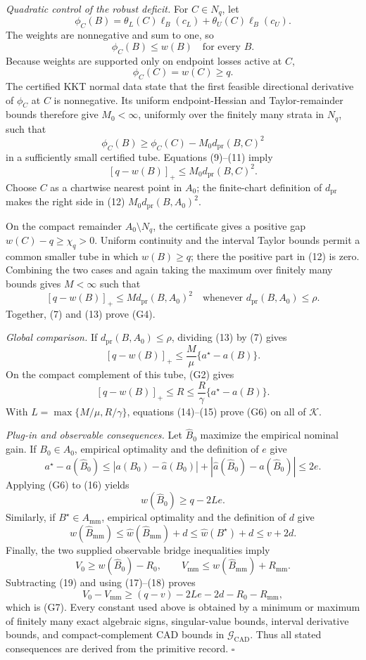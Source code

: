 \emph{Quadratic control of the robust deficit.}
For \(C\in N_q\), let
\[
\phi_C(B)=\theta_L(C)\ell_B(c_L)+\theta_U(C)\ell_B(c_U).
\tag{8}
\]
The weights are nonnegative and sum to one, so
\[
\phi_C(B)\le w(B)
\quad\text{for every }B.
\tag{9}
\]
Because weights are supported only on endpoint losses active at \(C\),
\[
\phi_C(C)=w(C)\ge q.
\tag{10}
\]
The certified KKT normal data state that the first feasible directional derivative of \(\phi_C\) at \(C\) is nonnegative.  Its uniform endpoint-Hessian and Taylor-remainder bounds therefore give \(M_0<\infty\), uniformly over the finitely many strata in \(N_q\), such that
\[
\phi_C(B)\ge\phi_C(C)-M_0d_{\mathrm{pr}}(B,C)^2
\tag{11}
\]
in a sufficiently small certified tube.  Equations (9)--(11) imply
\[
[q-w(B)]_+\le M_0d_{\mathrm{pr}}(B,C)^2.
\tag{12}
\]
Choose \(C\) as a chartwise nearest point in \(A_0\); the finite-chart definition of \(d_{\mathrm{pr}}\) makes the right side in (12) \(M_0d_{\mathrm{pr}}(B,A_0)^2\).

On the compact remainder \(A_0\setminus N_q\), the certificate gives a positive gap \(w(C)-q\ge\chi_q>0\).  Uniform continuity and the interval Taylor bounds permit a common smaller tube in which \(w(B)\ge q\); there the positive part in (12) is zero.  Combining the two cases and again taking the maximum over finitely many bounds gives \(M<\infty\) such that
\[
[q-w(B)]_+\le Md_{\mathrm{pr}}(B,A_0)^2
\quad\text{whenever }d_{\mathrm{pr}}(B,A_0)\le\rho.
\tag{13}
\]
Together, (7) and (13) prove (G4).

\emph{Global comparison.}
If \(d_{\mathrm{pr}}(B,A_0)\le\rho\), dividing (13) by (7) gives
\[
[q-w(B)]_+\le\frac M\mu\{a^\star-a(B)\}.
\tag{14}
\]
On the compact complement of this tube, (G2) gives
\[
[q-w(B)]_+\le R
\le\frac R\gamma\{a^\star-a(B)\}.
\tag{15}
\]
With \(L=\max\{M/\mu,R/\gamma\}\), equations (14)--(15) prove (G6) on all of \(\mathcal K\).

\emph{Plug-in and observable consequences.}
Let \(\widehat B_0\) maximize the empirical nominal gain.  If \(B_0\in A_0\), empirical optimality and the definition of \(e\) give
\[
a^\star-a(\widehat B_0)
\le |a(B_0)-\widehat a(B_0)|
+|\widehat a(\widehat B_0)-a(\widehat B_0)|
\le2e.
\tag{16}
\]
Applying (G6) to (16) yields
\[
w(\widehat B_0)\ge q-2Le.
\tag{17}
\]
Similarly, if \(B^\star\in A_{\mathrm{mm}}\), empirical optimality and the definition of \(d\) give
\[
w(\widehat B_{\mathrm{mm}})
\le\widehat w(\widehat B_{\mathrm{mm}})+d
\le\widehat w(B^\star)+d
\le v+2d.
\tag{18}
\]
Finally, the two supplied observable bridge inequalities imply
\[
V_0\ge w(\widehat B_0)-R_0,
\qquad
V_{\mathrm{mm}}\le w(\widehat B_{\mathrm{mm}})+R_{\mathrm{mm}}.
\tag{19}
\]
Subtracting (19) and using (17)--(18) proves
\[
V_0-V_{\mathrm{mm}}
\ge(q-v)-2Le-2d-R_0-R_{\mathrm{mm}},
\]
which is (G7).  Every constant used above is obtained by a minimum or maximum of finitely many exact algebraic signs, singular-value bounds, interval derivative bounds, and compact-complement CAD bounds in \(\mathscr G_{\mathrm{CAD}}\).  Thus all stated consequences are derived from the primitive record. \(\square\)


